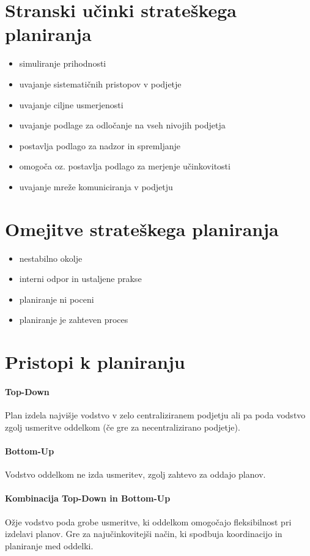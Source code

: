 \documentclass[a4paper,12pt]{report}
\begin{document}
   \section{Stranski učinki strateškega planiranja}
      \begin{itemize}
         \item simuliranje prihodnosti
         \item uvajanje sistematičnih pristopov v podjetje
         \item uvajanje ciljne usmerjenosti
         \item uvajanje podlage za odločanje na vseh nivojih podjetja
         \item postavlja podlago za nadzor in spremljanje
         \item omogoča oz. postavlja podlago za merjenje učinkovitosti
         \item uvajanje mreže komuniciranja v podjetju
      \end{itemize}
   
   \section{Omejitve strateškega planiranja}
      \begin{itemize}
         \item nestabilno okolje
         \item interni odpor in ustaljene prakse
         \item planiranje ni poceni
         \item planiranje je zahteven proces
      \end{itemize}

   \section{Pristopi k planiranju}
      \paragraph{Top-Down} Plan izdela najvišje vodstvo v zelo centraliziranem podjetju ali pa poda vodstvo zgolj usmeritve oddelkom (če gre za necentralizirano podjetje).
      \paragraph{Bottom-Up} Vodstvo oddelkom ne izda usmeritev, zgolj zahtevo za oddajo planov.
      \paragraph{Kombinacija Top-Down in Bottom-Up} Ožje vodstvo poda grobe usmeritve, ki oddelkom omogočajo fleksibilnost pri izdelavi planov. Gre za najučinkovitejši način, ki spodbuja koordinacijo in planiranje med oddelki.
\end{document}

